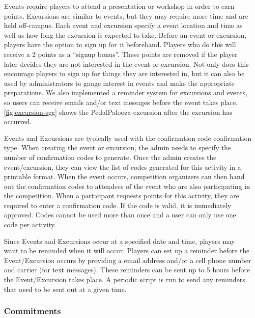 Events require players to attend a presentation or workshop in order to earn points.  Excursions are similar to events, but they may require more time and are held off-campus.  Each event and excursion specify a event location and time as well as how long the excursion is expected to take.  Before an event or excursion, players have the option to sign up for it beforehand.  Players who do this will receive a 2 points as a ``signup bonus''.  These points are removed if the player later decides they are not interested in the event or excursion.  Not only does this encourage players to sign up for things they are interested in, but it can also be used by administrators to gauge interest in events and make the appropriate preparations.  We also implemented a reminder system for excursions and events, so users can receive emails and/or text messages before the event takes place. \autoref{fig:excursion-sgg} shows the PedalPalooza excursion after the excursion has occurred.

Events and Excursions are typically used with the confirmation code confirmation type.  When creating the event or excursion, the admin needs to specify the number of confirmation codes to generate.  Once the admin creates the event/excursion, they can view the list of codes generated for this activity in a printable format.  When the event occurs, competition organizers can then hand out the confirmation codes to attendees of the event who are also participating in the competition.  When a participant requests points for this activity, they are required to enter a confirmation code.  If the code is valid, it is immediately approved.  Codes cannot be used more than once and a user can only use one code per activity.

Since Events and Excursions occur at a specified date and time, players may want to be reminded when it will occur. Players can set up a reminder before the Event/Excursion occurs by providing a email address and/or a cell phone number and carrier (for text messages). These reminders can be sent up to 5 hours before the Event/Excursion takes place. A periodic script is run to send any reminders that need to be sent out at a given time.

\subsubsection{Commitments}
\label{pages-getnutz:commitments}

